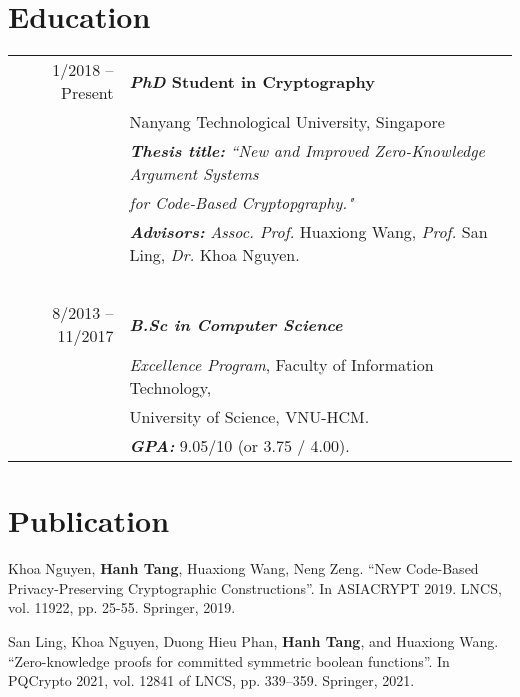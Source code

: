 \documentclass[a4paper, 11pt]{article}
\begin{document}
	\section{Education}
	\begin{tabular}{rl}	
		1/2018 -- Present & \textbf{\textit{PhD} Student in Cryptography} \\
		& Nanyang Technological University, Singapore   \\
		\ & \textbf{\textit{Thesis title:}} \textit{``New and Improved Zero-Knowledge Argument Systems}\\&\textit{           for Code-Based Cryptopgraphy."}\\
		
		\ & \textbf{\textit{Advisors:}} \textit{Assoc. Prof.} Huaxiong Wang, \textit{Prof.} San Ling, \textit{Dr.} Khoa Nguyen.\\
		\ & \ \\
		8/2013 -- 11/2017 & \textbf{\textit{B.Sc in Computer Science}} \\ 
		& \textit{Excellence Program}, Faculty of Information Technology,\\ &University of Science, VNU-HCM.\\
		\ & \textbf{\textit{GPA:}} 9.05/10 (or 3.75 / 4.00).
	\end{tabular}
	
	\section{Publication}
	Khoa Nguyen, \textbf{Hanh Tang}, Huaxiong Wang, Neng Zeng. ``New Code-Based Privacy-Preserving Cryptographic Constructions''. In ASIACRYPT 2019. LNCS, vol. 11922, pp. 25-55. Springer, 2019.
	
	San Ling, Khoa Nguyen, Duong Hieu Phan, \textbf{Hanh Tang}, and Huaxiong Wang. ``Zero-knowledge
	proofs for committed symmetric boolean functions''. In PQCrypto 2021,
	vol. 12841 of LNCS, pp. 339–359. Springer, 2021.
	
\end{document}

